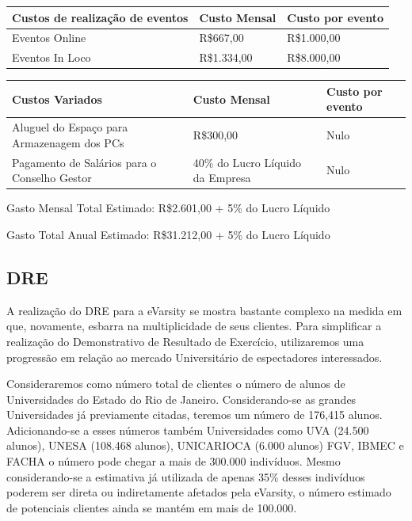 \documentclass[a4paper, 12pt]{paper}
\begin{document}
\begin{table}[ht]
	\centering
	\begin{tabular}{p{6cm}p{7cm}p{2cm}}
		\hline
		\cellcolor{gray}Custos de realização de eventos&\cellcolor{gray}Custo Mensal&\cellcolor{gray}Custo por evento\\
		\hline
		Eventos Online&R\$667,00&R\$1.000,00 \\
		Eventos In Loco&R\$1.334,00&R\$8.000,00 \\
		\hline
	\end{tabular}
\end{table}

\begin{table}[ht]
	\centering
	\begin{tabular}{p{6cm}p{7cm}p{2cm}}
		\hline
		\cellcolor{gray}Custos Variados&\cellcolor{gray}Custo Mensal&\cellcolor{gray}Custo por evento\\
		\hline
		Aluguel do Espaço para Armazenagem dos PCs&R\$300,00&Nulo  \\
		Pagamento de Salários para o Conselho Gestor& 40\% do Lucro Líquido da Empresa&Nulo \\
		\hline
	\end{tabular}
\end{table}
\newpage
Gasto Mensal Total Estimado: R\$2.601,00 + 5\% do Lucro Líquido

Gasto Total Anual Estimado: R\$31.212,00 + 5\% do Lucro Líquido

\subsection{DRE}
A realização do DRE para a eVarsity se mostra bastante complexo na medida em que, novamente, esbarra na multiplicidade de seus clientes. Para simplificar a realização do Demonstrativo de Resultado de Exercício, utilizaremos uma progressão em relação ao mercado Universitário de espectadores interessados.
	
Consideraremos como número total de clientes o número de alunos de Universidades do Estado do Rio de Janeiro. Considerando-se as grandes Universidades já previamente citadas, teremos um número de 176,415 alunos. Adicionando-se a esses números também Universidades como UVA (24.500 alunos), UNESA (108.468 alunos), UNICARIOCA (6.000 alunos) FGV, IBMEC e FACHA o número pode chegar a mais de 300.000 indivíduos. Mesmo considerando-se a estimativa já utilizada de apenas 35\% desses indivíduos poderem ser direta ou indiretamente afetados pela eVarsity, o número estimado de potenciais clientes ainda se mantém em mais de 100.000.
\end{document}
